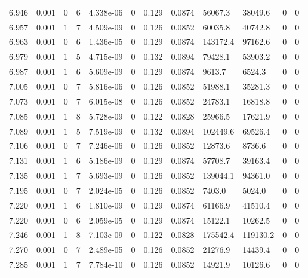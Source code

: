 \documentclass[preview]{standalone}
\begin{document}
{{{{{{{{\begin{tabular}{L{1.2cm}C{1.2cm} C{0.3cm}C{0.5cm} C{1.4cm}C{1.4cm} C{1.4cm}C{1.4cm} C{1.6cm}C{1.6cm} C{1.6cm}C{1.6cm}}
  6.946  &  0.001  & 0     &  6 &  4.338e-06  & 0  &  0.129&   0.0874& 56067.3 & 38049.6   &  0 & 0  \\ 
  6.957  &  0.001  & 1     &  7 &  4.509e-09  & 0  &  0.126&   0.0852& 60035.8 & 40742.8   &  0 & 0  \\ 
  6.963  &  0.001  & 0     &  6 &  1.436e-05  & 0  &  0.129&   0.0874& 143172.4 & 97162.6   &  0 & 0  \\ 
  6.979  &  0.001  & 1     &  5 &  4.715e-09  & 0  &  0.132&   0.0894& 79428.1 & 53903.2   &  0 & 0  \\ 
  6.987  &  0.001  & 1     &  6 &  5.609e-09  & 0  &  0.129&   0.0874& 9613.7 & 6524.3   &  0 & 0  \\ 
  7.005  &  0.001  & 0     &  7 &  5.816e-06  & 0  &  0.126&   0.0852& 51988.1 & 35281.3   &  0 & 0  \\ 
  7.073  &  0.001  & 0     &  7 &  6.015e-08  & 0  &  0.126&   0.0852& 24783.1 & 16818.8   &  0 & 0  \\ 
  7.085  &  0.001  & 1     &  8 &  5.728e-09  & 0  &  0.122&   0.0828& 25966.5 & 17621.9   &  0 & 0  \\ 
  7.089  &  0.001  & 1     &  5 &  7.519e-09  & 0  &  0.132&   0.0894& 102449.6 & 69526.4   &  0 & 0  \\ 
  7.106  &  0.001  & 0     &  7 &  7.246e-06  & 0  &  0.126&   0.0852& 12873.6 & 8736.6   &  0 & 0  \\ 
  7.131  &  0.001  & 1     &  6 &  5.186e-09  & 0  &  0.129&   0.0874& 57708.7 & 39163.4   &  0 & 0  \\ 
  7.135  &  0.001  & 1     &  7 &  5.693e-09  & 0  &  0.126&   0.0852& 139044.1 & 94361.0   &  0 & 0  \\ 
  7.195  &  0.001  & 0     &  7 &  2.024e-05  & 0  &  0.126&   0.0852& 7403.0 & 5024.0   &  0 & 0  \\ 
  7.220  &  0.001  & 1     &  6 &  1.810e-09  & 0  &  0.129&   0.0874& 61166.9 & 41510.4   &  0 & 0  \\ 
  7.220  &  0.001  & 0     &  6 &  2.059e-05  & 0  &  0.129&   0.0874& 15122.1 & 10262.5   &  0 & 0  \\ 
  7.246  &  0.001  & 1     &  8 &  7.103e-09  & 0  &  0.122&   0.0828& 175542.4 & 119130.2   &  0 & 0  \\ 
  7.270  &  0.001  & 0     &  7 &  2.489e-05  & 0  &  0.126&   0.0852& 21276.9 & 14439.4   &  0 & 0  \\ 
  7.285  &  0.001  & 1     &  7 &  7.784e-10  & 0  &  0.126&   0.0852& 14921.9 & 10126.6   &  0 & 0  \\ 

\end{tabular}}}}}}}}}
\end{document}
